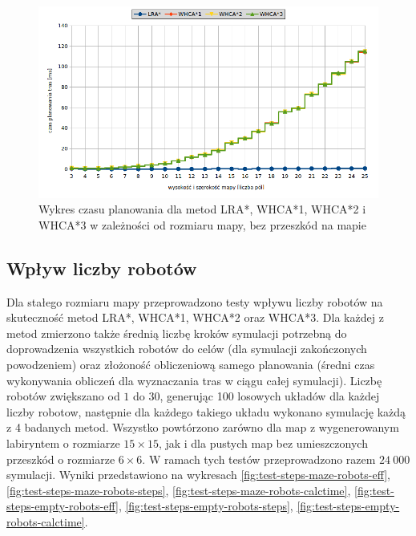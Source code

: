 \begin{figure}
	\centering
	\includegraphics[width=0.8\columnwidth]{img/plots/test-steps-empty-mapsize-calctime}
	\caption{Wykres czasu planowania dla metod LRA*, WHCA*1, WHCA*2 i WHCA*3 w zależności od rozmiaru mapy, bez przeszkód na mapie}
	\label{fig:test-steps-empty-mapsize-calctime}
\end{figure}


\subsection{Wpływ liczby robotów} %
\label{ch:tests-function-robots}
Dla stałego rozmiaru mapy przeprowadzono testy wpływu liczby robotów na skuteczność metod LRA*, WHCA*1, WHCA*2 oraz WHCA*3.
Dla każdej z metod zmierzono także średnią liczbę kroków symulacji potrzebną do doprowadzenia wszystkich robotów do celów (dla symulacji zakończonych powodzeniem) oraz złożoność obliczeniową samego planowania (średni czas wykonywania obliczeń dla wyznaczania tras w ciągu całej symulacji).
Liczbę robotów zwiększano od $1$ do $30$, generując 100 losowych układów dla każdej liczby robotow, następnie dla każdego takiego układu wykonano symulację każdą z 4 badanych metod.
Wszystko powtórzono zarówno dla map z wygenerowanym labiryntem o rozmiarze $15 \times 15$, jak i dla pustych map bez umieszczonych przeszkód o rozmiarze $6 \times 6$.
W ramach tych testów przeprowadzono razem $24\ 000$ symulacji.
Wyniki przedstawiono na wykresach \ref{fig:test-steps-maze-robots-eff}, \ref{fig:test-steps-maze-robots-steps}, \ref{fig:test-steps-maze-robots-calctime}, \ref{fig:test-steps-empty-robots-eff}, \ref{fig:test-steps-empty-robots-steps}, \ref{fig:test-steps-empty-robots-calctime}.


